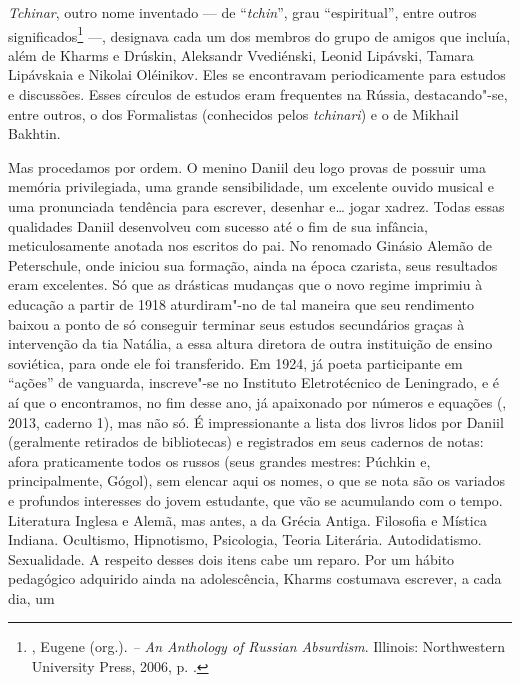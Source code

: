 \emph{Tchinar}, outro nome inventado --- de ``\emph{tchin}'', grau
``espiritual'', entre outros significados\footnote{,
Eugene (org.). \emph{ -- An Anthology of Russian
Absurdism}. Illinois: Northwestern University Press, 2006, p.
.} ---, designava cada um dos membros do grupo de
amigos que incluía, além de Kharms e Drúskin, Aleksandr Vvediénski,
Leonid Lipávski, Tamara Lipávskaia e Nikolai Oléinikov. Eles se
encontravam periodicamente para estudos e discussões. Esses círculos
de estudos eram frequentes na Rússia, destacando"-se, entre outros,
o dos Formalistas (conhecidos pelos \emph{tchinari}) e o de Mikhail
Bakhtin.

Mas procedamos por ordem. O menino Daniil deu logo provas de
possuir uma memória privilegiada, uma grande sensibilidade,
um excelente ouvido musical e uma pronunciada tendência para
escrever, desenhar e\ldots{} jogar xadrez. Todas essas qualidades
Daniil desenvolveu com sucesso até o fim de sua infância,
meticulosamente anotada nos escritos do pai. No renomado Ginásio
Alemão de Peterschule, onde iniciou sua formação, ainda na época
czarista, seus resultados eram excelentes. Só que as drásticas
mudanças que o novo regime imprimiu à educação a partir de 1918
aturdiram"-no de tal maneira que seu rendimento baixou a ponto de só
conseguir terminar seus estudos secundários graças à intervenção da
tia Natália, a essa altura diretora de outra instituição de ensino
soviética, para onde ele foi transferido. Em 1924, já poeta
participante em ``ações'' de vanguarda, inscreve"-se no Instituto
Eletrotécnico de Leningrado, e é aí que o encontramos, no fim
desse ano, já apaixonado por números e equações (, 2013, caderno 1), mas não só. É impressionante a lista dos livros lidos por Daniil (geralmente retirados de bibliotecas) e registrados
em seus cadernos de notas: afora praticamente todos os russos
(seus grandes mestres: Púchkin e, principalmente, Gógol), sem
elencar aqui os nomes, o que se nota são os variados e profundos
interesses do jovem estudante, que vão se acumulando com o tempo.
Literatura Inglesa e Alemã, mas antes, a da Grécia Antiga.
Filosofia e Mística Indiana. Ocultismo, Hipnotismo, Psicologia,
Teoria Literária. Autodidatismo. Sexualidade. A respeito desses
dois itens cabe um reparo. Por um hábito pedagógico adquirido
ainda na adolescência, Kharms costumava escrever, a cada dia, um
